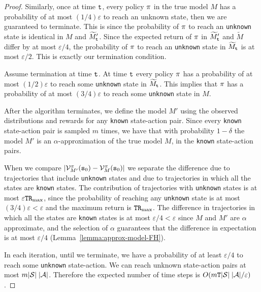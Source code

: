 \begin{proof}
Similarly, once at time ${\tt t}$, every policy $\pi$ in the true
model $M$ has a probability of at most $(1/4)\varepsilon$ to reach an
unknown state, then we are guaranteed to terminate. This is since the
probability of $\pi$ to reach an \texttt{unknown} state is identical in
$M$ and $\widetilde{M}'_{\tt t}$. Since the expected return of $\pi$
in $\widetilde{M}'_{\tt t}$ and $\widetilde{M}$ differ by at most
$\varepsilon/4$, the probability of $\pi$ to reach an \texttt{unknown}
state in $\widetilde{M}_{\tt t}$ is at most $\varepsilon/2$. This is
exactly our termination condition.
%



Assume termination at time ${\tt t}$. At time ${\tt t}$ every policy
$\pi$ has a probability of at most $(1/2)\varepsilon$ to reach
some \texttt{unknown} state in $\widetilde{M}_{\tt t}$. This implies that
$\pi$ has a probability of at most $(3/4)\varepsilon$ to reach
some \texttt{unknown} state in $M$.



After the algorithm terminates, we define the model $M'$ using the
observed distributions and rewards for any \texttt{known} state-action pair.
Since every \texttt{known} state-action pair is sampled $m$ times, we have
that with probability $1-\delta$ the model $M'$
is an $\alpha$-approximation of the true model $M$, in the \texttt{known}
state-action pairs.

When we compare
$|\mathcal{V}^\pi_{M'}({\tt s}_0)-\mathcal{V}^\pi_M({\tt s}_0)|$ we
separate the difference due to trajectories that include \texttt{unknown} states and due to trajectories in which all the states are \texttt{known} states. 
The contribution of trajectories with  \texttt{unknown} states is at most $\varepsilon{\tt T}{\tt R}_{\max }$,
since the probability of reaching any \texttt{unknown} state is at most
$(3/4)\varepsilon<\varepsilon$ and the maximum return is
${\tt T}{\tt R}_{\max }$. The difference in trajectories in which all the states are \texttt{known} states is at most
$\varepsilon/4<\varepsilon$ since $M$ and $M'$ are $\alpha$
approximate, and the selection of $\alpha$ guarantees that the
difference in expectation is at most $\varepsilon/4$
(Lemma~\ref{lemma:approx-model-FH}).

In each iteration, until we terminate, we have a probability of at
least $\varepsilon/4$ to reach some \texttt{unknown} state-action. We can reach
unknown state-action pairs at most $m |\mathcal{S}|\;|\mathcal{A}|$.
Therefore the expected number of time steps is  $O(m{\tt T}
|\mathcal{S}|\;|\mathcal{A}|/\varepsilon)$.
\end{proof}

